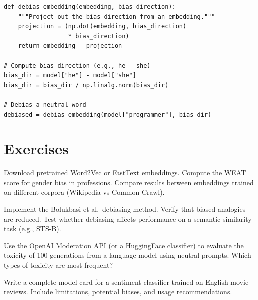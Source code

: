\begin{codeblock}[title=\textbf{Geometric Debiasing}]
\begin{verbatim}
def debias_embedding(embedding, bias_direction):
    """Project out the bias direction from an embedding."""
    projection = (np.dot(embedding, bias_direction)
                  * bias_direction)
    return embedding - projection

# Compute bias direction (e.g., he - she)
bias_dir = model["he"] - model["she"]
bias_dir = bias_dir / np.linalg.norm(bias_dir)

# Debias a neutral word
debiased = debias_embedding(model["programmer"], bias_dir)
\end{verbatim}
\end{codeblock}

\section{Exercises}
\label{sec:ethics:exercises}

\begin{exercise}
Download pretrained Word2Vec or FastText embeddings. Compute the WEAT
score for gender bias in professions. Compare results between embeddings
trained on different corpora (Wikipedia vs Common Crawl).
\end{exercise}

\begin{exercise}[Debiasing]
Implement the Bolukbasi et al.\ debiasing method. Verify that biased
analogies are reduced. Test whether debiasing affects performance on a
semantic similarity task (e.g., STS-B).
\end{exercise}

\begin{exercise}
Use the OpenAI Moderation API (or a HuggingFace classifier) to evaluate
the toxicity of 100 generations from a language model using neutral
prompts. Which types of toxicity are most frequent?
\end{exercise}

\begin{exercise}
Write a complete model card for a sentiment classifier trained on
English movie reviews. Include limitations, potential biases, and usage
recommendations.
\end{exercise}

